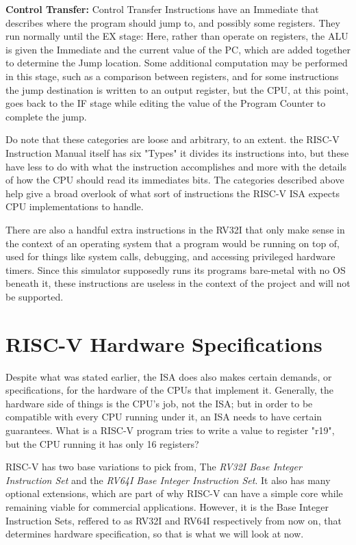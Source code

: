 \documentclass[12pt,twoside]{reedthesis}
\begin{document}
\textbf{Control Transfer:} Control Transfer Instructions have an Immediate that describes where the program should jump to, and possibly some registers. They run normally until the EX stage: Here, rather than operate on registers, the ALU is given the Immediate and the current value of the PC, which are added together to determine the Jump location. Some additional computation may be performed in this stage, such as a comparison between registers, and for some instructions the jump destination is written to an output register, but the CPU, at this point, goes back to the IF stage while editing the value of the Program Counter to complete the jump.

Do note that these categories are loose and arbitrary, to an extent. the RISC-V Instruction Manual itself has six "Types" it divides its instructions into, but these have less to do with what the instruction accomplishes and more with the details of how the CPU should read its immediates bits. The categories described above help give a broad overlook of what sort of instructions the RISC-V ISA expects CPU implementations to handle.

There are also a handful extra instructions in the RV32I that only make sense in the context of an operating system that a program would be running on top of, used for things like system calls, debugging, and accessing privileged hardware timers. Since this simulator supposedly runs its programs bare-metal with no OS beneath it, these instructions are useless in the context of the project and will not be supported.

\section{RISC-V Hardware Specifications}

Despite what was stated earlier, the ISA  does also makes certain demands, or specifications, for the hardware of the CPUs that implement it. Generally, the hardware side of things is the CPU's job, not the ISA; but in order to be compatible with every CPU running under it, an ISA needs to have certain guarantees. What is a RISC-V program tries to write a value to register "r19", but the CPU running it has only 16 registers?

RISC-V has two base variations to pick from, The \textit{RV32I Base Integer Instruction Set} and the \textit{RV64I Base Integer Instruction Set}. It also has many optional extensions, which are part of why RISC-V can have a simple core while remaining viable for commercial applications. However, it is the Base Integer Instruction Sets, reffered to as RV32I and RV64I respectively from now on, that determines hardware specification, so that is what we will look at now.
\end{document}
